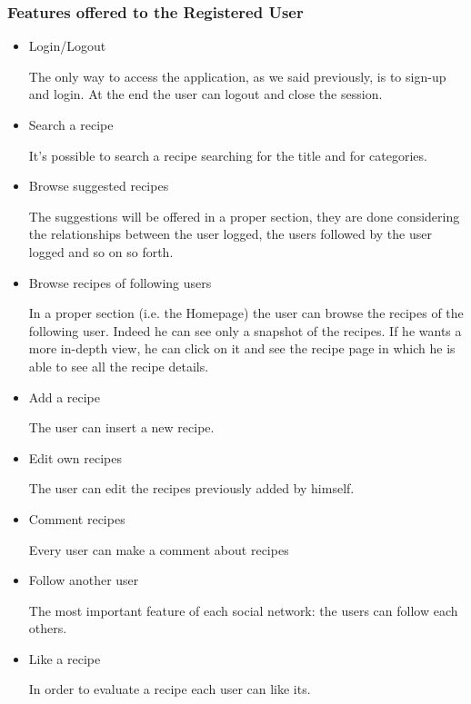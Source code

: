 \documentclass[a4paper]{report}
\begin{document}
\subsubsection{Features offered to the Registered User}
\begin{itemize}
	\item Login/Logout
	
	\noindent The only way to access the application, as we said previously, is to sign-up and login. At the end the user can logout and close the session.
	
	\item Search a recipe
	
	\noindent It's possible to search a recipe searching for the title and for categories.
	
	\item Browse suggested recipes
	
	\noindent The suggestions will be offered in a proper section, they are done considering the relationships between the user logged, the users followed by the user logged and so on so forth.
	
	\item Browse recipes of following users
	
	\noindent In a proper section (i.e. the Homepage) the user can browse the recipes of the following user. Indeed he can see only a snapshot of the recipes. If he wants a more in-depth view, he can click on it and see the recipe page in which he is able to see all the recipe details. 
	
	\item Add a recipe
	
	\noindent The user can insert a new recipe.
	
	\item Edit own recipes
	
	\noindent The user can edit the recipes previously added by himself.
	
	\item Comment recipes
	
	\noindent
	Every user can make a comment about recipes
	
	\item Follow another user
	
	\noindent The most important feature of each social network: the users can follow each others. 
	
	
	\item Like a recipe
	
	\noindent In order to evaluate a recipe each user can like its.
\end{itemize}
\end{document}
